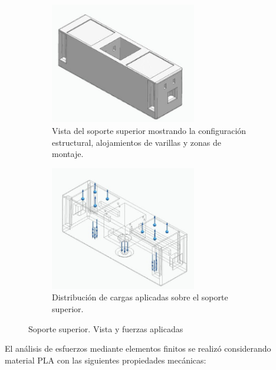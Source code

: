 \begin{figure}[H]
    \centering
    \begin{subfigure}{0.35\textwidth}
        \centering
        \includegraphics[width=0.7\textwidth]{img/SuperiorReal_simplificado_vista.jpg}
        \caption{Vista del soporte superior mostrando la configuración estructural, alojamientos de varillas y zonas de montaje.}
        \label{fig:SuperiorReal_simplificado_vista}
    \end{subfigure}
    \hspace{0.5cm}
    \begin{subfigure}{0.35\textwidth}
        \centering
        \includegraphics[width=0.7\textwidth]{img/SuperiorReal_simplificado_fuerzas_app.jpg}
        \caption{Distribución de cargas aplicadas sobre el soporte superior.}
        \label{fig:SuperiorReal_simplificado_fuerzas_app}
    \end{subfigure}
    \caption{Soporte superior. Vista y fuerzas aplicadas}
\end{figure}

El análisis de esfuerzos mediante elementos finitos se realizó considerando material PLA con las siguientes propiedades mecánicas:

